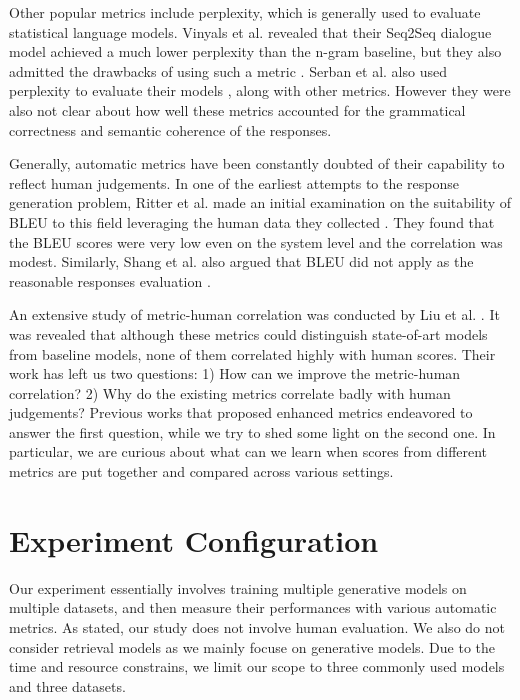 \documentclass[runningheads]{llncs}
\begin{document}
Other popular metrics include perplexity, which is generally used to evaluate statistical language models. Vinyals et al. revealed that their Seq2Seq dialogue model achieved a much lower perplexity than the n-gram baseline, but they also admitted the drawbacks of using such a metric \cite{GoogleChatbot}. Serban et al. also used perplexity to evaluate their models \cite{HRED}, along with other metrics. However they were also not clear about how well these metrics accounted for the grammatical correctness and semantic coherence of the responses.

Generally, automatic metrics have been constantly doubted of their capability to reflect human judgements. In one of the earliest attempts to the response generation problem, Ritter et al. made an initial examination on the suitability of BLEU to this field leveraging the human data they collected \cite{Ritter11}. They found that the BLEU scores were very low even on the system level and the correlation was modest. Similarly, Shang et al. also argued that BLEU did not apply as the reasonable responses evaluation \cite{Shang}.

An extensive study of metric-human correlation was conducted by Liu et al. \cite{HowNot}. It was revealed that although these metrics could distinguish state-of-art models from baseline models, none of them correlated highly with human scores. Their work has left us two questions: 1) How can we improve the metric-human correlation? 2) Why do the existing metrics correlate badly with human judgements? Previous works that proposed enhanced metrics endeavored to answer the first question, while we try to shed some light on the second one. In particular, we are curious about what can we learn when scores from different metrics are put together and compared across various settings.

\section{Experiment Configuration}
Our experiment essentially involves training multiple generative models on multiple datasets, and then measure their performances with various automatic metrics. As stated, our study does not involve human evaluation. We also do not consider retrieval models as we mainly focuse on generative models. Due to the time and resource constrains, we limit our scope to three commonly used models and three datasets.
\end{document}
